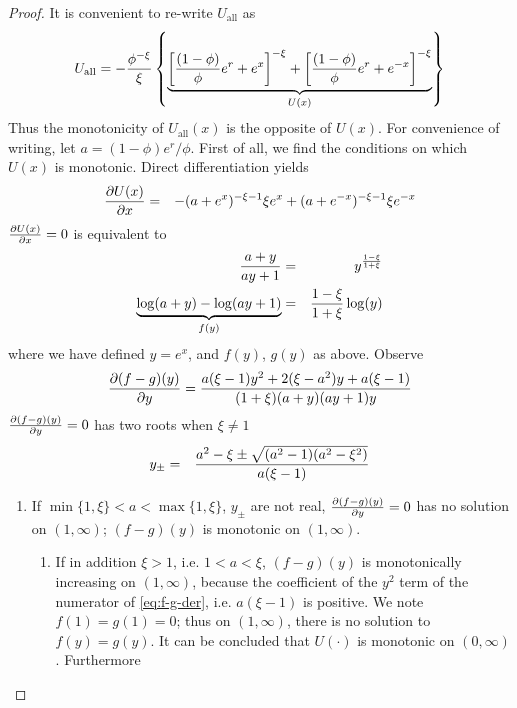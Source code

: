 \documentclass[11pt,a4]{amsart}
\newcommand{\pd}{\partial}
\newcommand{\1}{{\mathbf 1}}
\begin{document}
\begin{proof}
  It is convenient to re-write $U_{\text{all}}$ as
  \[
  U_{\text{all}} =
  -{\phi^{-\xi} \over \xi} \left\{
    \underbrace{
      \left[{(1 - \phi) \over \phi} e^r + e^x\right]^{-\xi}
      +
      \left[{(1 - \phi) \over \phi} e^r + e^{-x}\right]^{-\xi}
    }_{U(x)}
  \right\}
  \]
  Thus the monotonicity of $U_{\text{all}}(x)$ is the opposite of $U(x)$. For
  convenience of writing, let $a = (1 - \phi)e^r/\phi$.
  First of all, we find the conditions on which $U(x)$ is monotonic.
  Direct differentiation yields
  \begin{eqnarray*}
    {\pd U(x) \over \pd x}
    &=&
    -{
      (a + e^x)^{-\xi - 1} \xi e^x
    } + (a + e^{-x})^{-\xi - 1} \xi e^{-x}
  \end{eqnarray*}
  ${\pd U(x) \over \pd x} = 0$ is equivalent to
  \begin{eqnarray*}
    {a + y \over a y + 1} &=& y^{1 -\xi \over 1+\xi} \\
    \underbrace{\log(a + y) - \log(a y + 1)}_{f(y)} &=&
    {1 -\xi \over 1+\xi} \log(y)
  \end{eqnarray*}
  where we have defined $y = e^x$, and $f(y)$, $g(y)$ as above. Observe
  \begin{equation}
    \label{eq:f-g-der}
    {\pd (f -g)(y) \over \pd y} = {
      a (\xi - 1) y^2 + 2 (\xi - a^2) y + a(\xi - 1)
      \over
      (1 + \xi) (a + y) (a y + 1) y
    }
  \end{equation}
  ${\pd (f -g)(y) \over \pd y} = 0$ has two roots when $\xi \ne 1$
  \begin{eqnarray*}
    y_\pm &=& {
      a^2 - \xi \pm \sqrt{(a^2 - 1) (a^2 - \xi^2)}
      \over
      a (\xi - 1)
    }
  \end{eqnarray*}
  \begin{enumerate}
  \item If $\min\{1, \xi\} < a < \max\{1, \xi\}$, $y_\pm$ are not
    real, ${\pd (f -g)(y) \over \pd y} = 0$ has no solution on
    $(1, \infty)$; $(f -g)(y)$ is monotonic on $(1, \infty)$.
    \begin{enumerate}
    \item If in addition $\xi > 1$, i.e. $1 < a < \xi$, $(f - g)(y)$
      is monotonically increasing on $(1, \infty)$, because the
      coefficient of the $y^2$ term of the numerator of
      \eqref{eq:f-g-der}, i.e. $a (\xi - 1)$ is positive. We note
      $f(1) = g(1) = 0$; thus on $(1, \infty)$, there is no solution
      to $f(y) = g(y)$. It can be concluded that $U(\cdot)$ is
      monotonic on $(0, \infty)$. Furthermore

\end{enumerate}
\end{enumerate}
\end{proof}
\end{document}
